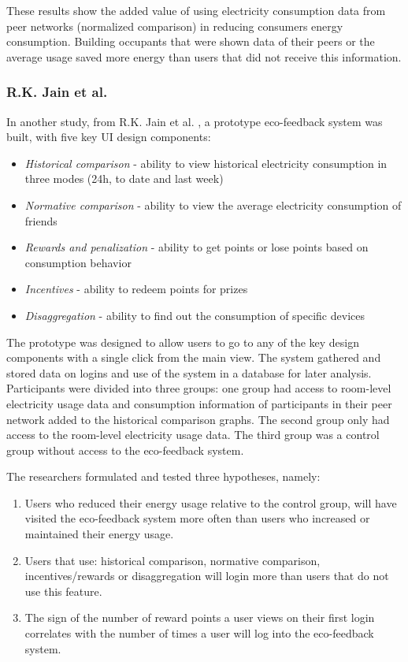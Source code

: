 \documentclass[journal]{vgtc}                %
\begin{document}
These results show the added value of using electricity consumption data from peer networks (normalized comparison) in reducing consumers energy consumption. Building occupants that were shown data of their peers or the average usage saved more energy than users that did not receive this information.

\subsubsection{R.K. Jain et al.}
In another study, from R.K. Jain et al. \cite{jain2012assessing}, a prototype eco-feedback system was built, with five key UI design components:
\begin{itemize}
\item \textit{Historical comparison} - ability to view historical electricity consumption in three modes (24h, to date and last week)
\item \textit{Normative comparison} - ability to view the average electricity consumption of friends
\item \textit{Rewards and penalization} - ability to get points or lose points based on consumption behavior
\item \textit{Incentives} - ability to redeem points for prizes
\item \textit{Disaggregation} - ability to find out the consumption of specific devices
\end{itemize}

The prototype was designed to allow users to go to any of the key design components with a single click from the main view. The system gathered and stored data on logins and use of the system in a database for later analysis.\\

Participants were divided into three groups: one group had access to room-level electricity usage data and consumption information of participants in their peer network added to the historical comparison graphs. 
The second group only had access to the room-level electricity usage data.
The third group was a control group without access to the eco-feedback system.

The researchers formulated and tested three hypotheses, namely:
\begin{enumerate}
\item Users who reduced their energy usage relative to the control group, will have visited the eco-feedback system more often than users who increased or maintained their energy usage.
\item Users that use: historical comparison, normative comparison, incentives/rewards or disaggregation will login more than users that do not use this feature.
\item The sign of the number of reward points a user views on their first login correlates with the number of times a user will log into the eco-feedback system.
\end{enumerate}
\end{document}
